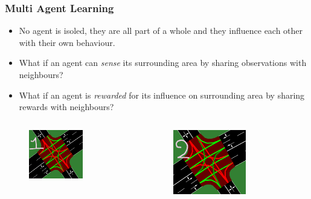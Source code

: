 \documentclass[dvipsnames]{beamer}
\begin{document}
\begin{frame}
\frametitle{Multi Agent Learning}

  {\footnotesize
  \begin{itemize}
    \item No agent is isoled, they are all part of a whole and they influence each other with their own behaviour.
    \item What if an agent can \textit{sense} its surrounding area by sharing observations with neighbours?
    \item What if an agent is \textit{rewarded} for its influence on surrounding area by sharing rewards with neighbours?
  \end{itemize}
  }

  \begin{columns}
    \begin{column}{0.3\textwidth}
      \begin{figure}
        \centering
        \includegraphics[width=0.65\textwidth]{figures/sumo-rf-tls-1.png}
      \end{figure}
    \end{column}
    \begin{column}{0.3\textwidth}
      \begin{figure}
        \centering
        \includegraphics[width=0.65\textwidth]{figures/sumo-rf-tls-2.png}

\end{figure}
\end{column}
\end{columns}
\end{frame}
\end{document}

